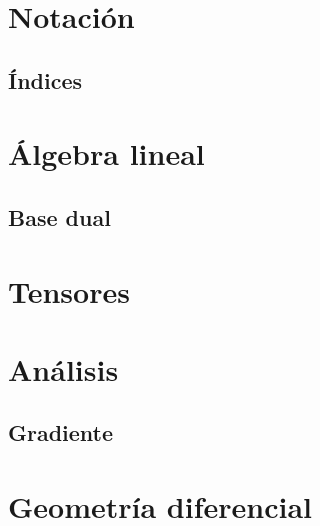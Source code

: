 \documentclass[11pt,fleqn]{book}
\begin{document}
\chapter{Notaci\'on}\label{ch:notacion}

\section{\'Indices}\label{sec:indices}

\chapter{Álgebra lineal}\label{ch:algebra-lineal}
\section{Base dual}\label{sec:base-dual}

\chapter{Tensores}\label{ch:tensores}

\chapter{An\'alisis}\label{ch:analisis}
\section{Gradiente}\label{sec:gradiente}

\chapter{Geometría diferencial}\label{ch:geometria-diferencial}

\end{document}

